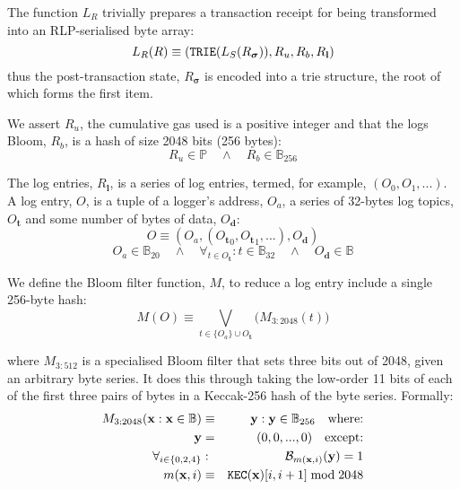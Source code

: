 \documentclass[9pt,oneside]{amsart}
\begin{document}
\begin{multicols}{2}
The function $L_R$ trivially prepares a transaction receipt for being transformed into an RLP-serialised byte array:
\begin{equation}
L_R(R) \equiv (\mathtt{\small TRIE}(L_S(R_{\boldsymbol{\sigma}})), R_u, R_b, R_\mathbf{l})
\end{equation}
thus the post-transaction state, $R_{\boldsymbol{\sigma}}$ is encoded into a trie structure, the root of which forms the first item.

We assert $R_u$, the cumulative gas used is a positive integer and that the logs Bloom, $R_b$, is a hash of size 2048 bits (256 bytes):
\begin{equation}
R_u \in \mathbb{P} \quad \wedge \quad R_b \in \mathbb{B}_{256}
\end{equation}


The log entries, $R_\mathbf{l}$, is a series of log entries, termed, for example, $(O_0, O_1, ...)$. A log entry, $O$, is a tuple of a logger's address, $O_a$, a series of 32-bytes log topics, $O_\mathbf{t}$ and some number of bytes of data, $O_\mathbf{d}$:
\begin{equation}
O \equiv (O_a, ({O_\mathbf{t}}_0, {O_\mathbf{t}}_1, ...), O_\mathbf{d})
\end{equation}
\begin{equation}
O_a \in \mathbb{B}_{20} \quad \wedge \quad \forall_{t \in O_\mathbf{t}}: t \in \mathbb{B}_{32} \quad \wedge \quad O_\mathbf{d} \in \mathbb{B}
\end{equation}

We define the Bloom filter function, $M$, to reduce a log entry include a single 256-byte hash:
\begin{equation}
M(O) \equiv \bigvee_{t \in \{O_a\} \cup O_\mathbf{t}} \big( M_{3:2048}(t) \big)
\end{equation}

where $M_{3:512}$ is a specialised Bloom filter that sets three bits out of 2048, given an arbitrary byte series. It does this through taking the low-order 11 bits of each of the first three pairs of bytes in a Keccak-256 hash of the byte series. Formally:
\begin{eqnarray}
M_{3:2048}(\mathbf{x}: \mathbf{x} \in \mathbb{B}) & \equiv & \mathbf{y}: \mathbf{y} \in \mathbb{B}_{256} \quad \text{where:}\\
\mathbf{y} & = & (0, 0, ..., 0) \quad \text{except:}\\
\forall_{i \in \{0, 2, 4\}}&:& \mathcal{B}_{m(\mathbf{x}, i)}(\mathbf{y}) = 1\\
m(\mathbf{x}, i) &\equiv& \mathtt{\tiny KEC}(\mathbf{x})[i, i + 1] \bmod 2048
\end{eqnarray}


\end{multicols}
\end{document}

